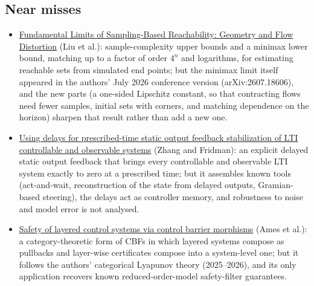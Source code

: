 \documentclass[11pt,a4paper]{article}
\begin{document}
\subsection*{Near misses}
\begin{itemize}[leftmargin=*]
  \item \href{https://arxiv.org/abs/2610.40473}{Fundamental Limits of Sampling-Based Reachability: Geometry and Flow Distortion} (Liu et al.): sample-complexity upper bounds and a minimax lower bound, matching up to a factor of order $4^n$ and logarithms, for estimating reachable sets from simulated end points; but the minimax limit itself appeared in the authors' July 2026 conference version (arXiv:2607.18606), and the new parts (a one-sided Lipschitz constant, so that contracting flows need fewer samples, initial sets with corners, and matching dependence on the horizon) sharpen that result rather than add a new one.
  \item \href{https://arxiv.org/abs/2610.38417}{Using delays for prescribed-time static output feedback stabilization of LTI controllable and observable systems} (Zhang and Fridman): an explicit delayed static output feedback that brings every controllable and observable \ac{LTI} system exactly to zero at a prescribed time; but it assembles known tools (act-and-wait, reconstruction of the state from delayed outputs, Gramian-based steering), the delays act as controller memory, and robustness to noise and model error is not analysed.
  \item \href{https://arxiv.org/abs/2610.38108}{Safety of layered control systems via control barrier morphisms} (Ames et al.): a category-theoretic form of \acp{CBF} in which layered systems compose as pullbacks and layer-wise certificates compose into a system-level one; but it follows the authors' categorical Lyapunov theory (2025--2026), and its only application recovers known reduced-order-model safety-filter guarantees.
\end{itemize}
\end{document}
